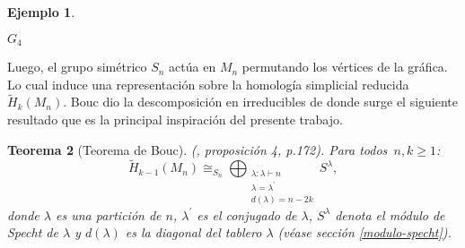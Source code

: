 \documentclass[12pt]{book}
\newtheorem{theorem}{Teorema}[section]
\theoremstyle{definition}
\newtheorem{example}[theorem]{Ejemplo}
\newcounter{in}
\newcounter{ini}
\begin{document}
\begin{example}
\begin{center}
\begin{minipage}{0.26\linewidth}
    $G_{4}$
  \end{minipage}
%
%
\end{center}
\end{example}

Luego, el grupo simétrico $S_n$ actúa en $M_n$ permutando los vértices
de la gráfica. Lo cual induce una representación sobre la homología
simplicial reducida $\widetilde H_{k}(M_{n})$. Bouc \cite{MR756517}
dio la descomposición en irreducibles de donde surge el siguiente
resultado que es la principal inspiración del presente trabajo.

\begin{theorem}[Teorema de Bouc]{\normalfont(\cite{MR756517},
    proposición 4, p.172)}. 
    \label{bouc}
   Para todos~$n,k\geq1$:
  \begin{equation}
    \widetilde H_{k-1}(M_{n})\cong_{S_{n}}\bigoplus_{\substack{\lambda:\lambda\vdash n\\
      \lambda=\lambda^{'}\\d(\lambda)=n-2k}} S^{\lambda},
  \end{equation}
  donde $\lambda$ es una partición de $n$, $\lambda^{'}$ es el conjugado de $\lambda$, $S^{\lambda}$ denota el módulo de Specht de $\lambda$ y $d(\lambda)$ es la diagonal del tablero $\lambda$ (véase sección \ref{modulo-specht}).
\end{theorem}
\end{document}
